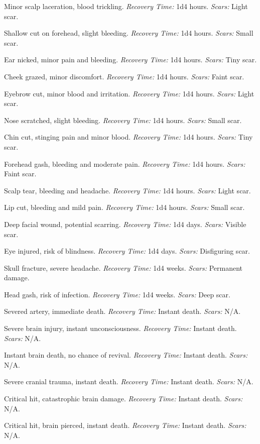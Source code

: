 \documentclass[12pt]{book}  %
\begin{document}
\begin{description}[labelwidth=1.5em, leftmargin=*, itemsep=0.3em]
    \item[01 -] Minor scalp laceration, blood trickling. \textit{Recovery Time:} 1d4 hours. \textit{Scars:} Light scar.
    \item[02 -] Shallow cut on forehead, slight bleeding. \textit{Recovery Time:} 1d4 hours. \textit{Scars:} Small scar.
    \item[03 -] Ear nicked, minor pain and bleeding. \textit{Recovery Time:} 1d4 hours. \textit{Scars:} Tiny scar.
    \item[04 -] Cheek grazed, minor discomfort. \textit{Recovery Time:} 1d4 hours. \textit{Scars:} Faint scar.
    \item[05 -] Eyebrow cut, minor blood and irritation. \textit{Recovery Time:} 1d4 hours. \textit{Scars:} Light scar.
    \item[06 -] Nose scratched, slight bleeding. \textit{Recovery Time:} 1d4 hours. \textit{Scars:} Small scar.
    \item[07 -] Chin cut, stinging pain and minor blood. \textit{Recovery Time:} 1d4 hours. \textit{Scars:} Tiny scar.
    \item[08 -] Forehead gash, bleeding and moderate pain. \textit{Recovery Time:} 1d4 hours. \textit{Scars:} Faint scar.
    \item[09 -] Scalp tear, bleeding and headache. \textit{Recovery Time:} 1d4 hours. \textit{Scars:} Light scar.
    \item[10 -] Lip cut, bleeding and mild pain. \textit{Recovery Time:} 1d4 hours. \textit{Scars:} Small scar.
    \item[11 -] Deep facial wound, potential scarring. \textit{Recovery Time:} 1d4 days. \textit{Scars:} Visible scar.
    \item[12 -] Eye injured, risk of blindness. \textit{Recovery Time:} 1d4 days. \textit{Scars:} Disfiguring scar.
    \item[13 -] Skull fracture, severe headache. \textit{Recovery Time:} 1d4 weeks. \textit{Scars:} Permanent damage.
    \item[14 -] Head gash, risk of infection. \textit{Recovery Time:} 1d4 weeks. \textit{Scars:} Deep scar.
    \item[15 -] Severed artery, immediate death. \textit{Recovery Time:} Instant death. \textit{Scars:} N/A.
    \item[16 -] Severe brain injury, instant unconsciousness. \textit{Recovery Time:} Instant death. \textit{Scars:} N/A.
    \item[17 -] Instant brain death, no chance of revival. \textit{Recovery Time:} Instant death. \textit{Scars:} N/A.
    \item[18 -] Severe cranial trauma, instant death. \textit{Recovery Time:} Instant death. \textit{Scars:} N/A.
    \item[19 -] Critical hit, catastrophic brain damage. \textit{Recovery Time:} Instant death. \textit{Scars:} N/A.
    \item[20 -] Critical hit, brain pierced, instant death. \textit{Recovery Time:} Instant death. \textit{Scars:} N/A.
\end{description}
\end{document}
